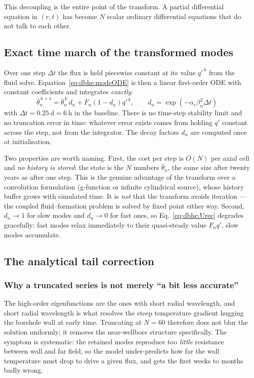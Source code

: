 This decoupling is the entire point of the transform. A partial differential
equation in $(r,t)$ has become $N$ scalar ordinary differential equations that
do not talk to each other.

\subsection{Exact time march of the transformed modes}
\label{sec:dbhe:march}

Over one step $\Delta t$ the flux is held piecewise constant at its value
$q'^{\,k}$ from the fluid solve. Equation~\eqref{eq:dbhe:modeODE} is then a
linear first-order ODE with constant coefficients and integrates \emph{exactly}:
\begin{equation}
\boxed{\; \bar\theta_n^{\,k+1}=\bar\theta_n^{\,k}\,d_n +F_n\left(1-d_n\right)q'^{\,k},
\qquad d_n=\exp\!\left(-\alpha_e\beta_n^{2}\Delta t\right) \; }
\label{eq:dbhe:Urec}
\end{equation}
with $\Delta t=\SI{0.25}{\day}=\SI{6}{\hour}$ in the baseline. There is no
time-step stability limit and no truncation error in time: whatever error exists
comes from holding $q'$ constant across the step, not from the integrator. The
decay factors $d_n$ are computed once at initialisation.

Two properties are worth naming. First, the cost per step is $O(N)$ per axial
cell and \emph{no history is stored}: the state is the $N$ numbers
$\bar\theta_n$, the same size after twenty years as after one step. This is the
genuine advantage of the transform over a convolution formulation (g-function or
infinite cylindrical source), whose history buffer grows with simulated time. It
is \emph{not} that the transform avoids iteration --- the coupled
fluid--formation problem is solved by fixed point either way. Second,
$d_n\to1$ for slow modes and $d_n\to0$ for fast ones, so
Eq.~\eqref{eq:dbhe:Urec} degrades gracefully: fast modes relax immediately to
their quasi-steady value $F_n q'$, slow modes accumulate.

\subsection{The analytical tail correction}
\label{sec:dbhe:tail}

\subsubsection{Why a truncated series is not merely ``a bit less accurate''}
The high-order eigenfunctions are the ones with short radial wavelength, and
short radial wavelength is what resolves the steep temperature gradient hugging
the borehole wall at early time. Truncating at $N=60$ therefore does not blur
the solution uniformly; it removes the near-wellbore structure specifically. The
symptom is systematic: the retained modes reproduce too \emph{little} resistance
between wall and far field, so the model under-predicts how far the wall
temperature must drop to drive a given flux, and gets the first weeks to months
badly wrong.

